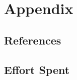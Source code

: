 \section{Appendix} \label{sec:appendix}

\subsection{References} \label{subsec:ref}

\subsection{Effort Spent} \label{subsec:effort}
